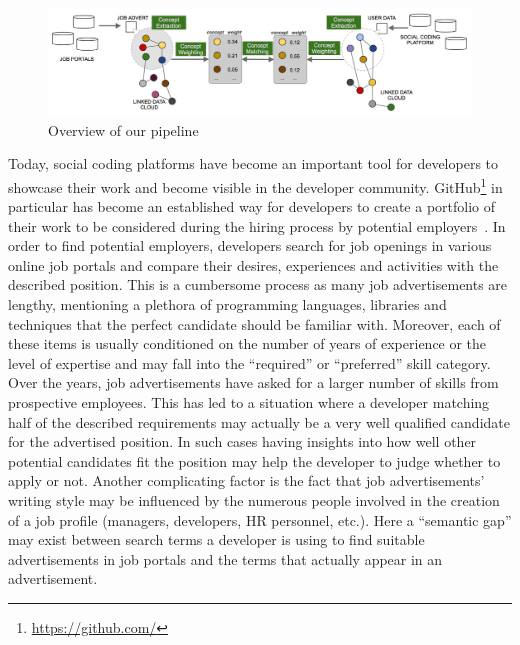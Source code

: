 \documentclass[conference]{IEEEtran}
\begin{document}
\begin{figure}[!htb]
\centering
\includegraphics[scale=0.35]{images/pipeline.png}
\caption{Overview of our pipeline}
\label{fig:pipeline}
\end{figure}

Today, social coding platforms have become an important tool for developers to showcase their work and become visible in the developer community. GitHub\footnote{\url{https://github.com/}} in particular has become an established way for developers to create a portfolio of their work to be considered during the hiring process by potential employers~\cite{dabbish2012social}. In order to find potential employers, developers search for job openings in various online job portals and compare their desires, experiences and activities with the described position. This is a cumbersome process as many job advertisements are lengthy, mentioning a plethora of programming languages, libraries and techniques that the perfect candidate should be familiar with.  Moreover, each of these items is usually conditioned on the number of years of experience or the level of expertise and may fall into the ``required'' or ``preferred'' skill category. Over the years, job advertisements have asked for a larger number of skills from prospective employees. This has led to a situation where a developer matching half of the described requirements may actually be a very well qualified candidate for the advertised position. In such cases having insights into how well other potential candidates fit the position may help the developer to judge whether to apply or not. Another complicating factor is the fact that job advertisements' writing style may be influenced by the numerous people involved in the creation of a job profile (managers, developers, HR personnel, etc.). Here a ``semantic gap'' may exist between search terms a developer is using to find suitable advertisements in job portals and the terms that actually appear in an advertisement. 
\end{document}
